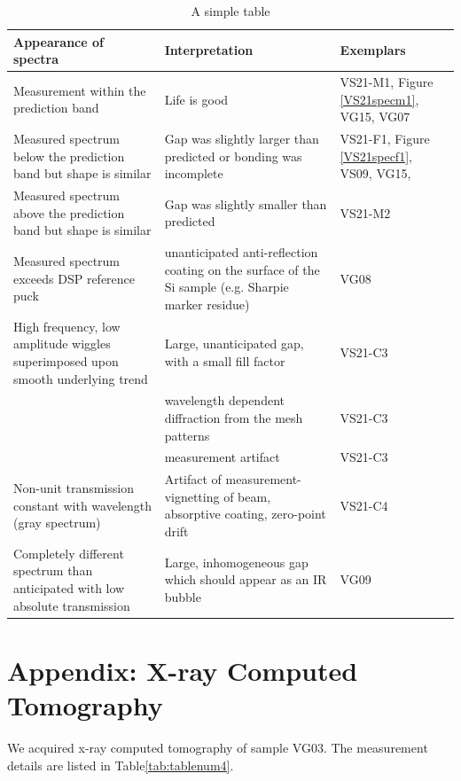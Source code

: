 \documentclass[osajnl,preprint,showpacs,superscriptaddress,12pt]{revtex4-1} %
\begin{document}
\begin{table}[h!]
  \caption{A simple table}
  \begin{center}
    \begin{tabular}{ |p{8cm}| p{8cm} | p{2.2cm} |}
    \hline
    Appearance of spectra & Interpretation & Exemplars \\
    \hline
    Measurement within the prediction band & Life is good & VS21-M1, Figure \ref{VS21specm1}, VG15, VG07\\
    \hline
    Measured spectrum below the prediction band but shape is similar & Gap was slightly larger than predicted or bonding was incomplete& VS21-F1, Figure \ref{VS21specf1}, VS09, VG15, \\
    \hline
    Measured spectrum above the prediction band but shape is similar & Gap was slightly smaller than predicted & VS21-M2\\
    \hline
    Measured spectrum exceeds DSP reference puck & unanticipated anti-reflection coating on the surface of the Si sample (e.g. Sharpie marker residue) & VG08\\
    \hline
    High frequency, low amplitude wiggles superimposed upon smooth underlying trend & Large, unanticipated gap, with a small fill factor  & VS21-C3\\   
     																			     & wavelength dependent diffraction from the mesh patterns & VS21-C3\\       
     																			     & measurement artifact  & VS21-C3\\       												
    \hline
    Non-unit transmission constant with wavelength (gray spectrum) & Artifact of measurement- vignetting of beam, absorptive coating, zero-point drift & VS21-C4 \\
    \hline
    Completely different spectrum than anticipated with low absolute transmission & Large, inhomogeneous gap which should appear as an IR bubble & VG09 \\
    \hline
    \end{tabular}
  \end{center}
\end{table}


\appendix

\section{Appendix: X-ray Computed Tomography}
We acquired x-ray computed tomography of sample VG03.  The measurement details are listed in Table\ref{tab:tablenum4}.
\end{document}
